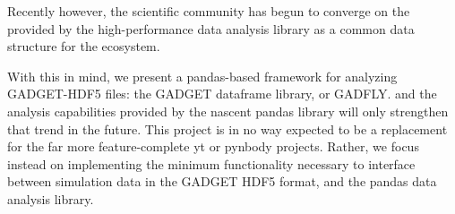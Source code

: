 Recently however, the scientific  community has begun to converge on the  provided by the high-performance  data analysis library as a common data structure for the ecosystem. 


With this in mind, we present a pandas-based framework for analyzing GADGET-HDF5 files: the GADGET dataframe library, or GADFLY.
and the analysis capabilities provided by the nascent pandas library will only strengthen that trend in the future.  
This project is in no way expected to be a replacement for the far more feature-complete yt or pynbody projects. Rather, we focus instead on implementing the minimum functionality necessary to interface between simulation data in the GADGET HDF5 format, and the pandas data analysis library.%
